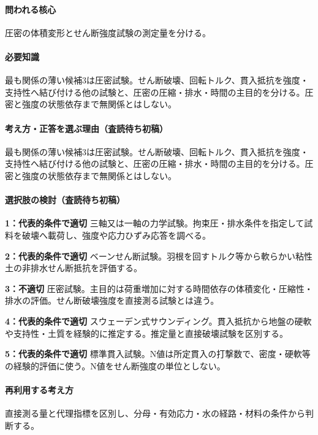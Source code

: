 \paragraph{問われる核心} 圧密の体積変形とせん断強度試験の測定量を分ける。

\paragraph{必要知識} 最も関係の薄い候補3は圧密試験。せん断破壊、回転トルク、貫入抵抗を強度・支持性へ結び付ける他の試験と、圧密の圧縮・排水・時間の主目的を分ける。圧密と強度の状態依存まで無関係とはしない。

\paragraph{考え方・正答を選ぶ理由（査読待ち初稿）} 最も関係の薄い候補3は圧密試験。せん断破壊、回転トルク、貫入抵抗を強度・支持性へ結び付ける他の試験と、圧密の圧縮・排水・時間の主目的を分ける。圧密と強度の状態依存まで無関係とはしない。

\paragraph{選択肢の検討（査読待ち初稿）}\mbox{}\par

\noindent\textbf{1：代表的条件で適切} 三軸又は一軸の力学試験。拘束圧・排水条件を指定して試料を破壊へ載荷し、強度や応力ひずみ応答を調べる。\par

\noindent\textbf{2：代表的条件で適切} ベーンせん断試験。羽根を回すトルク等から軟らかい粘性土の非排水せん断抵抗を評価する。\par

\noindent\textbf{3：不適切} 圧密試験。主目的は荷重増加に対する時間依存の体積変化・圧縮性・排水の評価。せん断破壊強度を直接測る試験とは違う。\par

\noindent\textbf{4：代表的条件で適切} スウェーデン式サウンディング。貫入抵抗から地盤の硬軟や支持性・土質を経験的に推定する。推定量と直接破壊試験を区別する。\par

\noindent\textbf{5：代表的条件で適切} 標準貫入試験。N値は所定貫入の打撃数で、密度・硬軟等の経験的評価に使う。N値をせん断強度の単位としない。\par

\paragraph{再利用する考え方} 直接測る量と代理指標を区別し、分母・有効応力・水の経路・材料の条件から判断する。

